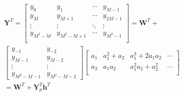 \begin{equation}
    \label{eq:ICC_w_trans}
    \begin{aligned}
        &\bm{Y}^T = \left[\begin{array}{c|c|c|c}
            y_0 & y_1 & \cdots & y_{M-1} \\ 
            y_M & y_{M+1} & \cdots & y_{2M-1} \\
            \vdots & \vdots & \ddots & \vdots \\
            y_{M^2-M} & y_{M^2-M+1} &\cdots & y_{M^2-1} \\
            \end{array}\right] = \bm{W}^T + \\
            &\left[\begin{array}{c|c}
                y_{-1} & y_{-2} \\ 
                y_{M-1} & y_{M-2} \\
                \vdots & \vdots \\
                y_{M^2-M-1} & y_{M^2-M-2}
                \end{array}\right]  
                \left[\begin{array}{cccc}
                    a_1 & a_1^2+a_2 & a_1^3+2a_1a_2 & \cdots \\ 
                    a_2 & a_1a_2 & a_1^2a_2+a_2^2 & \cdots \\
                    \end{array}\right] \\
            &= \bm{W}^T + \bm{Y}_p^T\bm{h}^T
    \end{aligned}
\end{equation}
